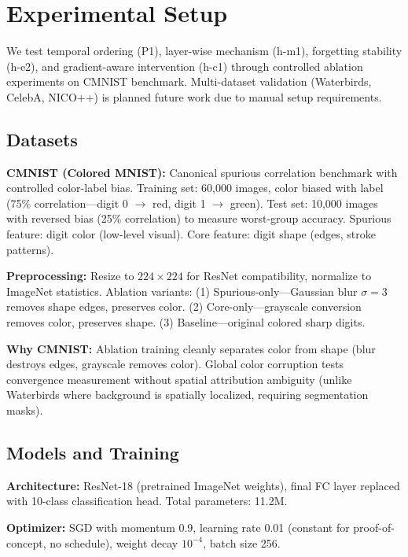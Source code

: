\section{Experimental Setup}
\label{sec:setup}

We test temporal ordering (P1), layer-wise mechanism (h-m1), forgetting stability (h-e2), and gradient-aware intervention (h-c1) through controlled ablation experiments on CMNIST benchmark. Multi-dataset validation (Waterbirds, CelebA, NICO++) is planned future work due to manual setup requirements.

\subsection{Datasets}

\textbf{CMNIST (Colored MNIST):} Canonical spurious correlation benchmark with controlled color-label bias. Training set: 60,000 images, color biased with label (75\% correlation---digit 0 $\rightarrow$ red, digit 1 $\rightarrow$ green). Test set: 10,000 images with reversed bias (25\% correlation) to measure worst-group accuracy. Spurious feature: digit color (low-level visual). Core feature: digit shape (edges, stroke patterns).

\textbf{Preprocessing:} Resize to $224\times224$ for ResNet compatibility, normalize to ImageNet statistics. Ablation variants: (1) Spurious-only---Gaussian blur $\sigma=3$ removes shape edges, preserves color. (2) Core-only---grayscale conversion removes color, preserves shape. (3) Baseline---original colored sharp digits.

\textbf{Why CMNIST:} Ablation training cleanly separates color from shape (blur destroys edges, grayscale removes color). Global color corruption tests convergence measurement without spatial attribution ambiguity (unlike Waterbirds where background is spatially localized, requiring segmentation masks).

\subsection{Models and Training}

\textbf{Architecture:} ResNet-18 (pretrained ImageNet weights), final FC layer replaced with 10-class classification head. Total parameters: 11.2M.

\textbf{Optimizer:} SGD with momentum 0.9, learning rate 0.01 (constant for proof-of-concept, no schedule), weight decay $10^{-4}$, batch size 256.

